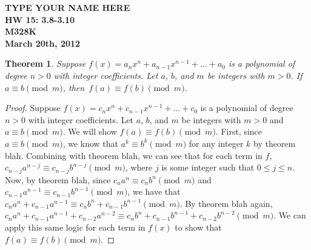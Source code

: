 \documentclass[12pt,leqno]{article}
\numberwithin{equation}{section}
\newtheorem{thm}{Theorem}[section]
\theoremstyle{definition}
\begin{document}
\thispagestyle{plain}
\begin{flushright}
\large{\textbf{TYPE YOUR NAME HERE \\
HW 15: 3.8-3.10\\
M328K \\
March 20th, 2012 \\}}
\end{flushright}

\markboth{}{} \setcounter{section}{0} \baselineskip=18pt

\setcounter{tocdepth}{4}



\setcounter{section}{3}

\setcounter{thm}{7}


\begin{thm}
Suppose $f(x) = a_nx^n + a_{n-1}x^{n-1} + \hdots + a_0$ is a
polynomial of degree $n>0$ with integer coefficients.  Let $a$, $b$,
and $m$ be integers with $m > 0$.  If $a \equiv b \pmod{m}$,
then~$f(a) \equiv f(b) \pmod{m}$.
\end{thm}

\begin{proof}[Proof]
Suppose $f(x) = c_nx^n + c_{n-1}x^{n-1} + \hdots + c_0$ is a polynomial of degree $n>0$ with integer coefficients.  Let $a$, $b$, and $m$ be integers with $m > 0$ and $a \equiv b \pmod{m}$.  We will show $f(a) \equiv f(b) \pmod{m}$.  First, since $a \equiv b \pmod{m}$, we know that $a^k \equiv b^k \pmod{m}$ for any integer $k$ by theorem blah.  Combining with theorem blah, we can see that for each term in $f$, $c_{n-j}a^{n-j} \equiv c_{n-j}b^{n-j} \pmod{m}$, where $j$ is some integer such that $0 \leq j \leq n$.  Now, by theorem blah, since $c_na^n \equiv c_nb^n \pmod{m}$ and $c_{n-1}a^{n-1} \equiv c_{n-1}b^{n-1} \pmod{m}$, we have that $c_na^n + c_{n-1}a^{n-1} \equiv c_nb^n + c_{n-1}b^{n-1} \pmod{m}$.  By theorem blah again, $c_na^n + c_{n-1}a^{n-1} + c_{n-2}a^{n-2} \equiv c_nb^n + c_{n-1}b^{n-1} + c_{n-2}b^{n-2} \pmod{m}$.  We can apply this same logic for each term in $f(x)$ to show that $f(a) \equiv f(b) \pmod{m}$.
\end{proof}
\end{document}
